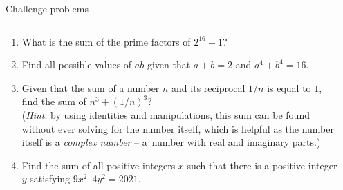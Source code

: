 \documentclass[9pt,aspectratio=169]{beamer}
\begin{document}
\begin{frame}{Challenge problems}
  \begin{columns}[T]
    \begin{column}{0.5\textwidth}
      \begin{enumerate}
        \item What is the sum of the prime factors of  $2^{16} - 1$?
        \item Find all possible values of $ab$ given that $a+ b = 2$ and $a^4 + b^4 = 16$. 
        \item Given that the sum of a number $n$ and its reciprocal $1/n$ is equal to $1$, find the sum of $n^3 + (1/n)^3$? \\
        (\emph{Hint}: by using identities and manipulations, this sum can be found without ever solving for the number itself, which is helpful as the number itself is a \emph{complex number} – a~number with real and imaginary parts.)
        \item Find the sum of all positive integers $x$ such that there is a positive integer $y$ satisfying $9x^2 – 4y^2 = 2021$.
      \end{enumerate}
    \end{column}
    \begin{column}{0.5\textwidth}
    \end{column}
  \end{columns}
\end{frame}


\end{document}

